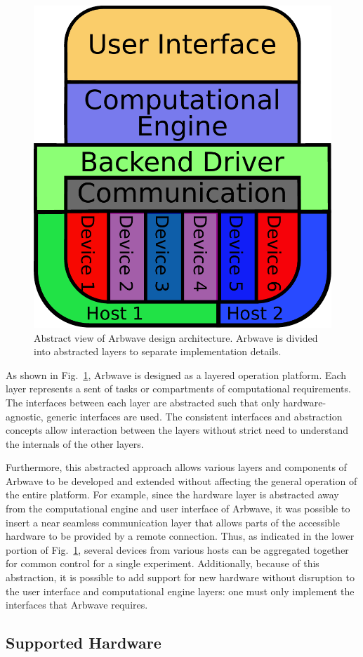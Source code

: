 \begin{figure}[ht!]
  \centerline{\includegraphics[width=.4\textwidth]{figures/design-layout}}
  \caption[Arbwave design architecture]{
    Abstract view of Arbwave design architecture.  Arbwave is divided into
    abstracted layers to separate implementation details.
  }
  \label{fig:intro:design}
\end{figure}

As shown in Fig.~\ref{fig:intro:design}, Arbwave is designed as a layered
operation platform.  Each layer represents a sent of tasks or compartments of
computational requirements.  The interfaces between each layer are abstracted
such that only hardware-agnostic, generic interfaces are used.  The consistent
interfaces and abstraction concepts allow interaction between the layers without
strict need to understand the internals of the other layers.

Furthermore, this abstracted approach allows various layers and components of
Arbwave to be developed and extended without affecting the general operation of
the entire platform.  For example, since the hardware layer is abstracted away
from the computational engine and user interface of Arbwave, it was possible to
insert a near seamless communication layer that allows parts of the accessible
hardware to be provided by a remote connection.  Thus, as indicated in the lower
portion of Fig.~\ref{fig:intro:design}, several devices from various hosts can
be aggregated together for common control for a single experiment.
Additionally, because of this abstraction, it is possible to add support for new
hardware without disruption to the user interface and computational engine
layers: one must only implement the interfaces that Arbwave requires.


\subsection{Supported Hardware}\label{sec:hardware}

